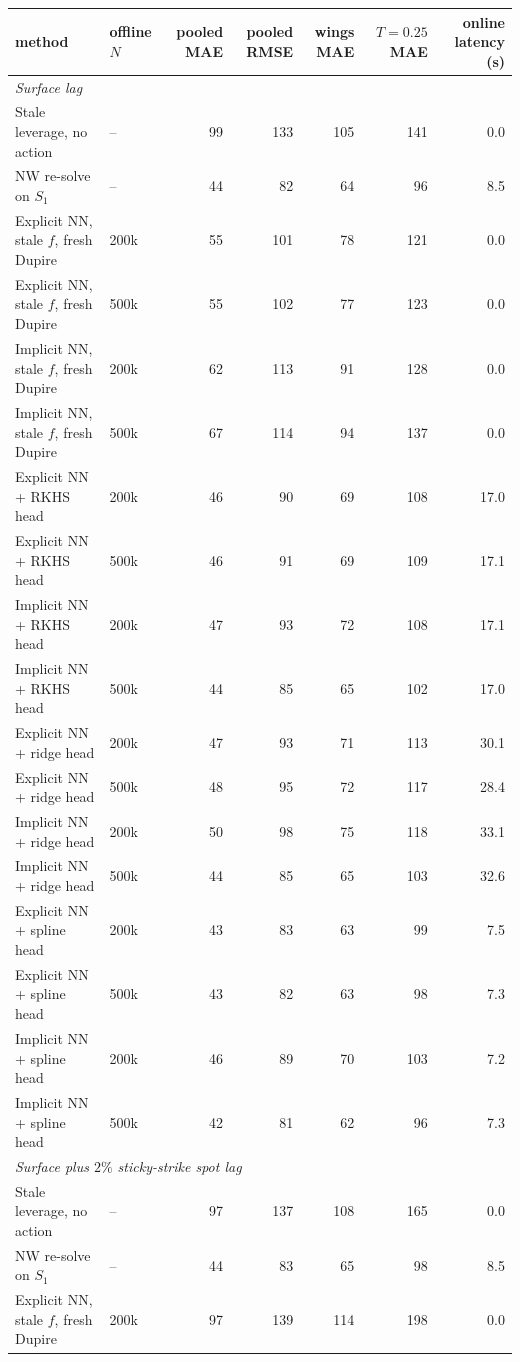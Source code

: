 \begin{tabular}{l l rr rr r}
\toprule
method & offline $N$ & pooled MAE & pooled RMSE & wings MAE & $T=0.25$ MAE & online latency (s)\\
\midrule
\multicolumn{7}{l}{\emph{Surface lag}}\\
Stale leverage, no action & -- & 99 & 133 & 105 & 141 & 0.0\\
NW re-solve on $S_1$ & -- & 44 & 82 & 64 & 96 & 8.5\\
Explicit NN, stale $f$, fresh Dupire & 200k & 55 & 101 & 78 & 121 & 0.0\\
Explicit NN, stale $f$, fresh Dupire & 500k & 55 & 102 & 77 & 123 & 0.0\\
Implicit NN, stale $f$, fresh Dupire & 200k & 62 & 113 & 91 & 128 & 0.0\\
Implicit NN, stale $f$, fresh Dupire & 500k & 67 & 114 & 94 & 137 & 0.0\\
Explicit NN + RKHS head & 200k & 46 & 90 & 69 & 108 & 17.0\\
Explicit NN + RKHS head & 500k & 46 & 91 & 69 & 109 & 17.1\\
Implicit NN + RKHS head & 200k & 47 & 93 & 72 & 108 & 17.1\\
Implicit NN + RKHS head & 500k & 44 & 85 & 65 & 102 & 17.0\\
Explicit NN + ridge head & 200k & 47 & 93 & 71 & 113 & 30.1\\
Explicit NN + ridge head & 500k & 48 & 95 & 72 & 117 & 28.4\\
Implicit NN + ridge head & 200k & 50 & 98 & 75 & 118 & 33.1\\
Implicit NN + ridge head & 500k & 44 & 85 & 65 & 103 & 32.6\\
Explicit NN + spline head & 200k & 43 & 83 & 63 & 99 & 7.5\\
Explicit NN + spline head & 500k & 43 & 82 & 63 & 98 & 7.3\\
Implicit NN + spline head & 200k & 46 & 89 & 70 & 103 & 7.2\\
Implicit NN + spline head & 500k & 42 & 81 & 62 & 96 & 7.3\\
\midrule
\multicolumn{7}{l}{\emph{Surface plus $2\%$ sticky-strike spot lag}}\\
Stale leverage, no action & -- & 97 & 137 & 108 & 165 & 0.0\\
NW re-solve on $S_1$ & -- & 44 & 83 & 65 & 98 & 8.5\\
Explicit NN, stale $f$, fresh Dupire & 200k & 97 & 139 & 114 & 198 & 0.0\\

\end{tabular}
